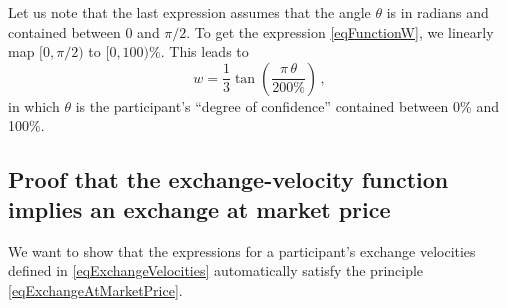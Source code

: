 \documentclass[letterpaper]{article}
\begin{document}
Let us note that the last expression assumes that the angle $\theta$ is in radians and contained between 0 and $\pi/2$. To get the expression \eqref{eqFunctionW}, we linearly map $[0,\pi/2)$ to $[0,100)\%$. This leads to
\begin{equation*}
    w = \frac{1}{3}\tan \left(\frac{\pi\, \theta}{200\%}\right)\,,
\end{equation*}
in which $\theta$ is the participant's ``degree of confidence'' contained between 0\% and 100\%.

\subsection{Proof that the exchange-velocity function implies an exchange at market price}\label{secProofExchangeAtMarketPrice}

We want to show that the expressions for a participant's exchange velocities defined in \eqref{eqExchangeVelocities} automatically satisfy the principle \eqref{eqExchangeAtMarketPrice}.
\end{document}
